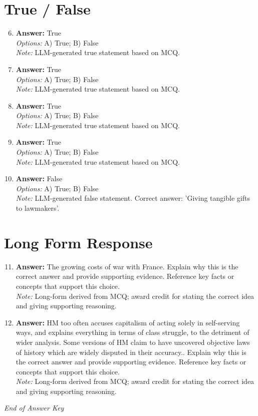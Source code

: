 \documentclass[12pt]{article}
\begin{document}
\section*{True / False}
\begin{enumerate}[label=\arabic*.]
\setcounter{enumi}{5}
\item \textbf{Answer:} True
\\ \textit{Options:} A) True; B) False
\\ \textit{Note:} LLM-generated true statement based on MCQ.
\item \textbf{Answer:} True
\\ \textit{Options:} A) True; B) False
\\ \textit{Note:} LLM-generated true statement based on MCQ.
\item \textbf{Answer:} True
\\ \textit{Options:} A) True; B) False
\\ \textit{Note:} LLM-generated true statement based on MCQ.
\item \textbf{Answer:} True
\\ \textit{Options:} A) True; B) False
\\ \textit{Note:} LLM-generated true statement based on MCQ.
\item \textbf{Answer:} False
\\ \textit{Options:} A) True; B) False
\\ \textit{Note:} LLM-generated false statement. Correct answer: 'Giving tangible gifts to lawmakers'.
\end{enumerate}

\section*{Long Form Response}
\begin{enumerate}[label=\arabic*.]
\setcounter{enumi}{10}
\item \textbf{Answer:} The growing costs of war with France. Explain why this is the correct answer and provide supporting evidence. Reference key facts or concepts that support this choice.
\\ \textit{Note:} Long-form derived from MCQ; award credit for stating the correct idea and giving supporting reasoning.
\item \textbf{Answer:} HM too often accuses capitalism of acting solely in self-serving ways, and explains everything in terms of class struggle, to the detriment of wider analysis. Some versions of HM claim to have uncovered objective laws of history which are widely disputed in their accuracy.. Explain why this is the correct answer and provide supporting evidence. Reference key facts or concepts that support this choice.
\\ \textit{Note:} Long-form derived from MCQ; award credit for stating the correct idea and giving supporting reasoning.
\end{enumerate}

\vfill
\noindent\textit{End of Answer Key}
\end{document}
